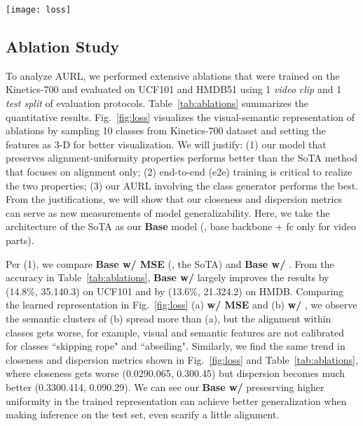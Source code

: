 \documentclass[10pt,twocolumn,letterpaper]{article}
\newlength\figsep\setlength{\figsep}{-2.8ex}
\begin{document}
\begin{figure*}
    \centering
    \texttt{[image: loss]}
    \caption{
    {\bf Ablations:} The representations of ablations w/ MSE loss, our , e2e training, and the AURL.
    \protect\scalebox{1}{\textbullet} and \protect represent visual and semantic features separately; colors are for different classes.
    Here, we randomly sample 10 classes from Kinetics-700 for visualization.
}
    \label{fig:loss}
    \vspace{\figsep}
\end{figure*}

\subsection{Ablation Study}
\label{sec:ablation}
To analyze AURL, we performed extensive ablations that were trained on the Kinetics-700 and evaluated on UCF101 and HMDB51 using 1 {\em video clip} and 1 {\em test split} of evaluation protocols.
Table~\ref{tab:ablations} summarizes the quantitative results.
Fig.~\ref{fig:loss} visualizes the visual-semantic representation of ablations by sampling 10 classes from Kinetics-700 dataset and setting the features as 3-D for better visualization.
We will justify:
(1) our model that preserves alignment-uniformity properties performs better than the SoTA method \cite{brattoli2020rethinking} that focuses on alignment only;
(2) end-to-end (e2e) training is critical to realize the two properties;
(3) our AURL involving the class generator performs the best.
From the justifications, we will show that our closeness and dispersion metrics can serve as new measurements of model generalizability.
Here, we take the architecture of the SoTA \cite{brattoli2020rethinking} as our {\bf Base} model (\ie, base backbone + fc only for video parts).

Per (1), we compare {\bf Base w/ MSE} (\ie, the SoTA) and {\bf Base w/ }.
From the accuracy in Table~\ref{tab:ablations}, {\bf Base w/ } largely improves the results by (14.8\%, 35.140.3) on UCF101 and by (13.6\%, 21.324.2) on HMDB.
Comparing the learned representation in Fig.~\ref{fig:loss} (a) {\bf w/ MSE}  and (b) {\bf w/ } , we observe the semantic clusters of (b) spread more than (a), but the alignment within classes gets worse, for example, visual and semantic features are not calibrated for classes ``skipping rope" and ``abseiling".
Similarly, we find the same trend in closeness and dispersion metrics shown in Fig.~\ref{fig:loss} and Table~\ref{tab:ablations}, where closeness gets worse (0.0290.065, 0.300.45) but dispersion becomes much better (0.3300.414, 0.090.29).
We can see our {\bf Base w/ } presesrving higher uniformity in the trained representation can achieve better generalization when making inference on the test set, even scarify a little alignment. 
\end{document}
